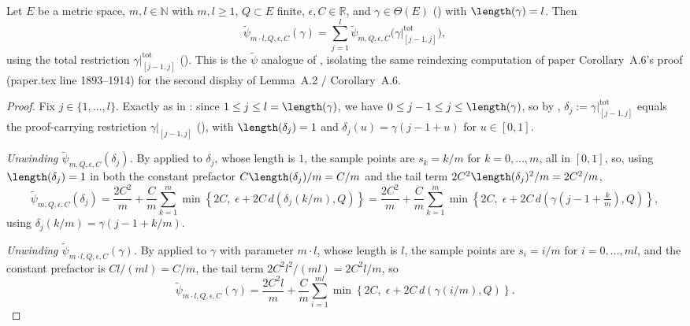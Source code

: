 \begin{helper}
  Let $E$ be a metric space, $m, l \in \mathbb{N}$ with $m,l \ge 1$, $Q \subset E$ finite,
  $\epsilon, C \in \mathbb{R}$, and $\gamma \in \Theta(E)$ () with
  $\length(\gamma) = l$. Then
  \[
    \tilde\psi_{m\cdot l,Q,\epsilon,C}(\gamma) = \sum_{j=1}^l \tilde\psi_{m,Q,\epsilon,C}\bigl(
      \gamma|^{\mathrm{tot}}_{[j-1,j]}\bigr)
    ,
  \]
  using the total restriction $\gamma|^{\mathrm{tot}}_{[j-1,j]}$ (). This
  is the $\tilde\psi$ analogue of , isolating the same reindexing computation
  of paper Corollary~A.6's proof (paper.tex line 1893--1914) for the second display of
  Lemma~A.2 / Corollary~A.6.
\end{helper}
\begin{proof}
  Fix $j \in \{1,\dotsc,l\}$. Exactly as in : since $1 \le j \le l =
  \length(\gamma)$, we have $0 \le j-1 \le j \le \length(\gamma)$, so by
  , $\delta_j := \gamma|^{\mathrm{tot}}_{[j-1,j]}$ equals the
  proof-carrying restriction $\gamma|_{[j-1,j]}$ (), with $\length(\delta_j) =
  1$ and $\delta_j(u) = \gamma(j-1+u)$ for $u \in [0,1]$.

  \emph{Unwinding $\tilde\psi_{m,Q,\epsilon,C}(\delta_j)$.} By  applied to
  $\delta_j$, whose length is $1$, the sample points are $s_k = k/m$ for $k=0,\dotsc,m$, all in
  $[0,1]$, so, using $\length(\delta_j) = 1$ in both the constant prefactor $C\length(\delta_j)/m =
  C/m$ and the tail term $2C^2\length(\delta_j)^2/m = 2C^2/m$,
  \[
    \tilde\psi_{m,Q,\epsilon,C}(\delta_j) = \frac{2C^2}{m}
      + \frac{C}{m} \sum_{k=1}^m \min\left\{2C,\; \epsilon + 2C\, d(\delta_j(k/m),Q)\right\}
    = \frac{2C^2}{m} + \frac{C}{m}\sum_{k=1}^m \min\left\{2C,\; \epsilon +
      2C\,d(\gamma(j-1+\tfrac{k}{m}),Q)\right\}
    ,
  \]
  using $\delta_j(k/m) = \gamma(j-1+k/m)$.

  \emph{Unwinding $\tilde\psi_{m\cdot l,Q,\epsilon,C}(\gamma)$.} By  applied to
  $\gamma$ with parameter $m\cdot l$, whose length is $l$, the sample points are $s_i = i/m$ for
  $i=0,\dotsc,ml$, and the constant prefactor is $Cl/(ml) = C/m$, the tail term
  $2C^2l^2/(ml)=2C^2l/m$, so
  \[
    \tilde\psi_{m\cdot l,Q,\epsilon,C}(\gamma) = \frac{2C^2l}{m}
      + \frac{C}{m}\sum_{i=1}^{ml}\min\left\{2C,\;\epsilon + 2C\,d(\gamma(i/m),Q)\right\}
    .
  \]


\end{proof}
